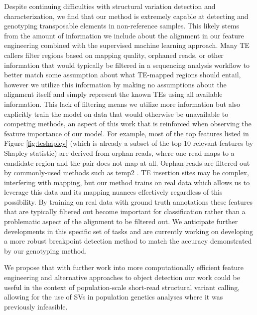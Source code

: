 Despite continuing difficulties with structural variation detection and characterization, we find that our method is extremely capable at detecting and genotyping transposable elements in non-reference samples. This likely stems from the amount of information we include about the alignment in our feature engineering combined with the supervised machine learning approach. Many TE callers filter regions based on mapping quality, orphaned reads, or other information that would typically be filtered in a sequencing analysis workflow \cite{yuBenchmarkAlgorithmDetecting2021} to better match some assumption about what TE-mapped regions should entail, however we utilize this information by making no assumptions about the alignment itself and simply represent the known TEs using all available information. This lack of filtering means we utilize more information but also explicitly train the model on data that would otherwise be unavailable to competing methods, an aspect of this work that is reinforced when observing the feature importance of our model. For example, most of the top features listed in Figure \ref{fig:teshapley} (which is already a subset of the top 10 relevant features by Shapley statistic) are derived from orphan reads, where one read maps to a candidate region and the pair does not map at all. Orphan reads are filtered out by commonly-used methods such as temp2 \cite{yuBenchmarkAlgorithmDetecting2021}. TE insertion sites may be complex, interfering with mapping, but our method trains on real data which allows us to leverage this data and its mapping nuances effectively regardless of this possibility. By training on real data with ground truth annotations these features that are typically filtered out become important for classification rather than a problematic aspect of the alignment to be filtered out. We anticipate further developments in this specific set of tasks and are currently working on developing a more robust breakpoint detection method to match the accuracy demonstrated by our genotyping method.

We propose that with further work into more computationally efficient feature engineering and alternative approaches to object detection our work could be useful in the context of population-scale short-read structural variant calling, allowing for the use of SVs in population genetics analyses where it was previously infeasible.